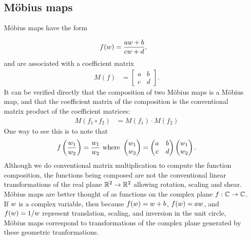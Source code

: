 \subsection{M\"obius maps}
\label{sec:moebiusdef}
M\"obius maps have the form

\begin{align}	f(w) &=  \frac{a w +b}{c w+ d},
\end{align}
and are associated with a coefficient matrix
\begin{align}
	M(f) &=
	\begin{bmatrix}
		a & b \\ c & d	\end{bmatrix}.
\end{align}
It can be verified directly that the composition of two M\"obius maps is a M\"obius map, and that the coefficient matrix of the composition is the conventional matrix product of the coefficient matrices:
\begin{align}
	M(f_1 \circ f_2) &= M(f_1 ) \cdot M( f_2)
\end{align}
One way to see this is to note that 
\begin{equation}
	f\left(\frac{w_1}{w_2}\right) =\frac{w_1}{w_2}  \mbox{ where } 	\begin{pmatrix}
		w_1 \\ w_2 
	\end{pmatrix} = 
	\begin{pmatrix}
		a & b \\ c & d
	\end{pmatrix} 
	\begin{pmatrix}
		w_1 \\ w_2
	\end{pmatrix}.
\end{equation}
Although we do conventional matrix multiplication to compute the function composition, the functions being composed are not the conventional linear transformations of the real plane  $\mathbb{R}^2\rightarrow\mathbb{R}^2$ allowing rotation, scaling and shear. M\"obius maps are better thought of as functions on the complex plane  $f:\mathbb{C}\rightarrow\mathbb{C}$.  
If $w$ is a complex variable, then because $f(w)=w+b$, $f(w)=a w$, and $f(w)=1/w$  represent translation, scaling, and inversion in the unit circle,  M\"obius maps correspond to transformations of the complex plane generated by these geometric tranformations. 

